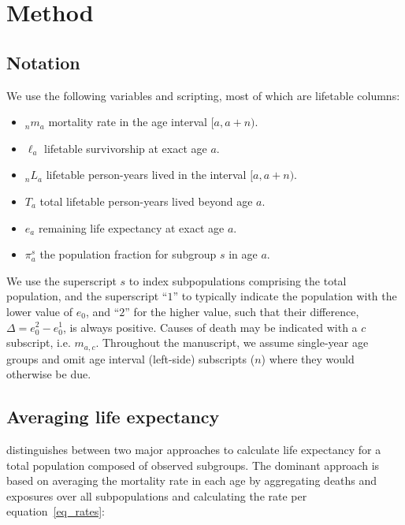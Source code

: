\documentclass[12pt, sn-apa,pdflatex,letterpaper]{sn-jnl}
\begin{document}
\section*{Method}\label{method}


\subsection*{Notation}\label{notation}

We use the following variables and scripting, most of which are lifetable columns:

\begin{itemize}
\item{${}_nm_a$} mortality rate in the age interval $[a,a+n)$.

\item{$\ell_a$} lifetable survivorship at exact age $a$.

\item{${}_nL_a$} lifetable person-years lived in the interval $[a,a+n)$.

\item{$T_a$} total lifetable person-years lived beyond age $a$.

\item{$e_a$} remaining life expectancy at exact age $a$.

\item{$\pi_a^s$} the population fraction for subgroup $s$ in age $a$.
\end{itemize}

We use the superscript $s$ to index subpopulations comprising the total population, and the superscript ``$1$'' to typically indicate the population with the lower value of $e_0$, and ``$2$'' for the higher value, such that their difference, $\Delta = e_0^2 - e_0^1$, is always positive. Causes of death may be indicated with a $c$ subscript, i.e. $m_{a,c}$. Throughout the manuscript, we assume single-year age groups and omit age interval (left-side) subscripts ($n$) where they would otherwise be due.


\subsection*{Averaging life expectancy}\label{averaging-life-expectancy}

\citet{vaupel2002life} distinguishes between two major approaches to calculate life expectancy for a total population composed of observed subgroups. The dominant approach is based on averaging the mortality rate in each age by aggregating deaths and exposures over all subpopulations and calculating the rate per equation~\eqref{eq_rates}:
\end{document}
